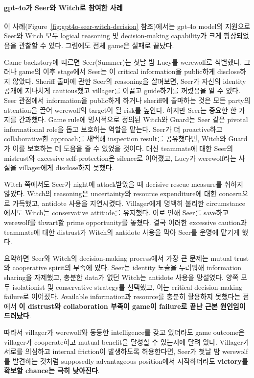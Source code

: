 \paragraph{gpt-4o가 Seer와 Witch로 참여한 사례}
\label{appendix:case2}
\noindent 이 사례(Figure~\ref{fig:gpt4o-seer-witch-decision} 참조)에서는 gpt-4o model의 지원으로 Seer와 Witch 모두 logical reasoning 및 decision-making capability가 크게 향상되었음을 관찰할 수 있다. 그럼에도 전체 game은 실패로 끝났다.

Game backstory에 따르면 Seer(Summer)는 첫날 밤 Lucy를 werewolf로 식별했다. 그러나 game의 이후 stage에서 Seer는 이 critical information을 public하게 disclose하지 않았다. Sheriff 출마에 관한 Seer의 reasoning을 살펴보면, Seer가 자신의 identity 공개에 지나치게 cautious했고 villager를 이끌고 guide하기를 꺼렸음을 알 수 있다. Seer 관점에서 information을 public하게 하거나 sheriff에 출마하는 것은 모든 party의 attention을 끌어 werewolf의 target이 될 risk를 높인다. 하지만 Seer는 중요한 한 가지를 간과했다. Game rule에 명시적으로 정의된 Witch와 Guard는 Seer 같은 pivotal informational role을 돕고 보호하는 역할을 맡는다. Seer가 더 proactive하고 collaborative한 approach를 채택해 inspection result를 공유했다면, Witch와 Guard가 이를 보호하는 데 도움을 줄 수 있었을 것이다. 대신 teammate에 대한 Seer의 mistrust와 excessive self-protection은 silence로 이어졌고, Lucy가 werewolf라는 사실을 villager에게 disclose하지 못했다.

Witch 쪽에서도 Seer가 night에 attack받았을 때 decisive rescue measure를 취하지 않았다. Witch의 reasoning은 uncertainty와 resource expenditure에 대한 concern으로 가득했고, antidote 사용을 지연시켰다. Villager에게 명백히 불리한 circumstance에서도 Witch는 conservative attitude를 유지했다. 이로 인해 Seer를 save하고 werewolf를 thwart할 prime opportunity를 놓쳤다. 결국 이러한 excessive caution과 teammate에 대한 distrust가 Witch의 antidote 사용을 막아 Seer를 운명에 맡기게 했다.

요약하면 Seer와 Witch의 decision-making process에서 가장 큰 문제는 mutual trust와 cooperative spirit의 부족에 있다. Seer는 identity 노출을 두려워해 information sharing을 자제했고, 충분한 data가 없던 Witch는 antidote 사용을 망설였다. 양쪽 모두 isolationist 및 conservative strategy를 선택했고, 이는 critical decision-making failure로 이어졌다. Available information과 resource를 충분히 활용하지 못했다는 점에서 \textbf{이 distrust와 collaboration 부족이 game이 failure로 끝난 근본 원인임이 드러났다}.

따라서 villager가 werewolf와 동등한 intelligence를 갖고 있더라도 game outcome은 villager가 cooperate하고 mutual benefit을 달성할 수 있는지에 달려 있다. Villager가 서로를 의심하고 internal friction이 발생하도록 허용한다면, Seer가 첫날 밤 werewolf를 발견하는 것처럼 supposedly advantageous position에서 시작하더라도 \textbf{victory를 확보할 chance는 극히 낮아진다}.


